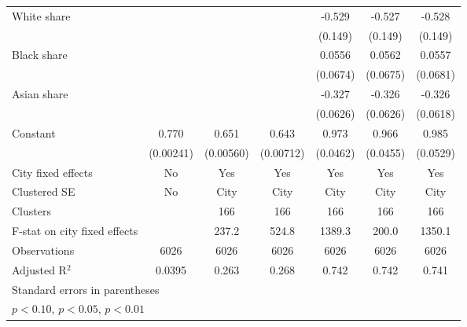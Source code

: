 {\begin{tabular}{l*{6}{c}}
\addlinespace
White share         &                     &                     &                     &      -0.529\sym{***}&      -0.527\sym{***}&      -0.528\sym{***}\\
                    &                     &                     &                     &     (0.149)         &     (0.149)         &     (0.149)         \\
\addlinespace
Black share         &                     &                     &                     &      0.0556         &      0.0562         &      0.0557         \\
                    &                     &                     &                     &    (0.0674)         &    (0.0675)         &    (0.0681)         \\
\addlinespace
Asian share         &                     &                     &                     &      -0.327\sym{***}&      -0.326\sym{***}&      -0.326\sym{***}\\
                    &                     &                     &                     &    (0.0626)         &    (0.0626)         &    (0.0618)         \\
\addlinespace
Constant            &       0.770\sym{***}&       0.651\sym{***}&       0.643\sym{***}&       0.973\sym{***}&       0.966\sym{***}&       0.985\sym{***}\\
                    &   (0.00241)         &   (0.00560)         &   (0.00712)         &    (0.0462)         &    (0.0455)         &    (0.0529)         \\
\midrule
City fixed effects  &          No         &         Yes         &         Yes         &         Yes         &         Yes         &         Yes         \\
Clustered SE        &          No         &        City         &        City         &        City         &        City         &        City         \\
Clusters            &                     &         166         &         166         &         166         &         166         &         166         \\
F-stat on city fixed effects&                     &       237.2         &       524.8         &      1389.3         &       200.0         &      1350.1         \\
Observations        &        6026         &        6026         &        6026         &        6026         &        6026         &        6026         \\
Adjusted R$^2$      &      0.0395         &       0.263         &       0.268         &       0.742         &       0.742         &       0.741         \\
\bottomrule
\multicolumn{7}{l}{\footnotesize Standard errors in parentheses}\\
\multicolumn{7}{l}{\footnotesize \sym{*} \(p<0.10\), \sym{**} \(p<0.05\), \sym{***} \(p<0.01\)}\\
\end{tabular}
}
